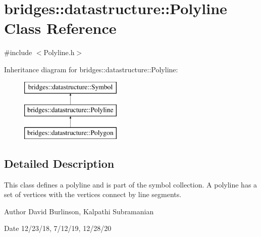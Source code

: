 \hypertarget{classbridges_1_1datastructure_1_1_polyline}{}\section{bridges\+:\+:datastructure\+:\+:Polyline Class Reference}
\label{classbridges_1_1datastructure_1_1_polyline}


{\ttfamily \#include $<$Polyline.\+h$>$}

Inheritance diagram for bridges\+:\+:datastructure\+:\+:Polyline\+:\begin{figure}[H]
\begin{center}
\leavevmode
\includegraphics[height=3.000000cm]{classbridges_1_1datastructure_1_1_polyline}
\end{center}
\end{figure}


\subsection{Detailed Description}
This class defines a polyline and is part of the symbol collection. A polyline has a set of vertices with the vertices connect by line segments. 

\begin{DoxyAuthor}{Author}
David Burlinson, Kalpathi Subramanian 
\end{DoxyAuthor}
\begin{DoxyDate}{Date}
12/23/18, 7/12/19, 12/28/20 
\end{DoxyDate}
